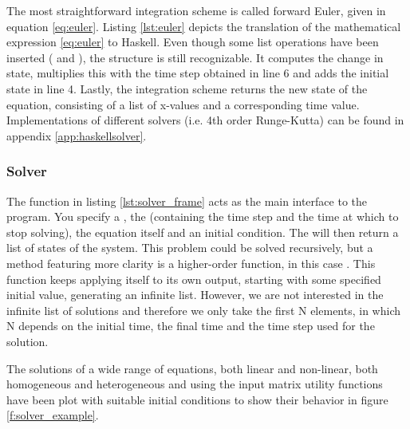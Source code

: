 The most straightforward integration scheme is called forward Euler, given in equation \ref{eq:euler}. Listing \ref{lst:euler} depicts the translation of the mathematical expression \ref{eq:euler} to Haskell. Even though some list operations have been inserted ( and ), the structure is still recognizable. It computes the change in state, multiplies this with the time step obtained in line 6 and adds the initial state in line 4. Lastly, the integration scheme returns the new state of the equation, consisting of a list of x-values and a corresponding time value. Implementations of different solvers (i.e. 4th order Runge-Kutta) can be found in appendix \ref{app:haskellsolver}.



\subsubsection{Solver}
The  function in listing \ref{lst:solver_frame} acts as the main interface to the program. You specify a , the  (containing the time step and the time at which to stop solving), the equation itself and an initial condition. The  will then return a list of states of the system. This problem could be solved recursively, but a method featuring more clarity is a higher-order function, in this case . This function keeps applying itself to its own output, starting with some specified initial value, generating an infinite list. However, we are not interested in the infinite list of solutions and therefore we only take the first N elements, in which N depends on the initial time, the final time and the time step used for the solution.

The solutions of a wide range of equations, both linear and non-linear, both homogeneous and heterogeneous and using the input matrix utility functions have been plot with suitable initial conditions to show their behavior in figure \ref{f:solver_example}.



